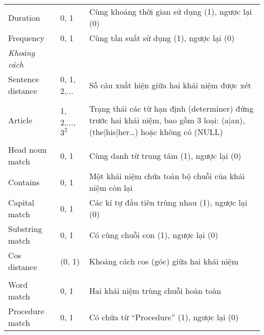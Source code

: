 \begin{table}[th]
\begin{tabularx}{\textwidth}{@{}>{\hspace{1em}}P{\raggedright}{0.3}lL@{}}
Duration & 0, 1 & Cùng khoảng thời gian sử dụng (1), ngược lại (0)\\
Frequency & 0, 1 & Cùng tần suất sử dụng (1), ngược lại (0)\\
\textit{Khoảng cách}\\
Sentence distance & 0, 1, 2,... & Số câu xuất hiện giữa hai khái niệm được xét\\
\\
Article & 1, 2,..., $3^{2}$ & Trạng thái các từ hạn định (determiner) đứng trước hai khái niệm, bao gồm 3 loại: (a|an), (the|his|her…) hoặc không có (NULL)\\
\\
Head noun match & 0, 1 & Cùng danh từ trung tâm (1), ngược lại (0)\\
Contains & 0, 1 & Một khái niệm chứa toàn bộ chuỗi của khái niệm còn lại\\
Capital match & 0, 1 & Các kí tự đầu tiên trùng nhau (1), ngược lại (0)\\
Substring match & 0, 1 & Có cùng chuỗi con (1), ngược lại (0)\\
Cos distance & (0, 1) & Khoảng cách cos (góc) giữa hai khái niệm\\
\\
Word match & 0, 1 & Hai khái niệm trùng chuỗi hoàn toàn\\
Procedure match & 0, 1 & Có chứa từ ``Procedure'' (1), ngược lại (0)\\
\bottomrule
\end{tabularx}
\end{table}
